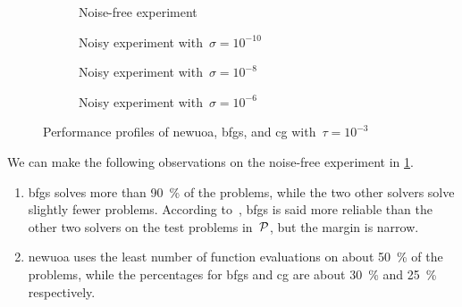 \begin{figure}[ht]
    \centering
    \begin{subfigure}[b]{0.49\textwidth}
        \centering
        \caption{Noise-free experiment}
        \label{fig:performance-profile-example-noiseless}
    \end{subfigure}
    \hfill
    \begin{subfigure}[b]{0.49\textwidth}
        \centering
        \caption{Noisy experiment with~$\sigma = 10^{-10}$}
        \label{fig:performance-profile-example-noisy-10}
    \end{subfigure}
    \par\bigskip
    \begin{subfigure}[b]{0.49\textwidth}
        \centering
        \caption{Noisy experiment with~$\sigma = 10^{-8}$}
        \label{fig:performance-profile-example-noisy-8}
    \end{subfigure}
    \hfill
    \begin{subfigure}[b]{0.49\textwidth}
        \centering
        \caption{Noisy experiment with~$\sigma = 10^{-6}$}
        \label{fig:performance-profile-example-noisy-6}
    \end{subfigure}
    \caption{Performance profiles of \gls{newuoa}, \gls{bfgs}, and \gls{cg} with~$\tau = 10^{-3}$}
    \label{fig:performance-profile-example}
\end{figure}

We can make the following observations on the noise-free experiment in \cref{fig:performance-profile-example-noiseless}.
\begin{enumerate}
    \item \Gls{bfgs} solves more than \SI{90}{\percent} of the problems, while the two other solvers solve slightly fewer problems.
    According to~\cite[\S~2]{More_Wild_2009}, \gls{bfgs} is said more reliable than the other two solvers on the test problems in~$\mathcal{P}$, but the margin is narrow.
    \item \Gls{newuoa} uses the least number of function evaluations on about \SI{50}{\percent} of the problems, while the percentages for \gls{bfgs} and \gls{cg} are about \SI{30}{\percent} and \SI{25}{\percent} respectively.
\end{enumerate}

